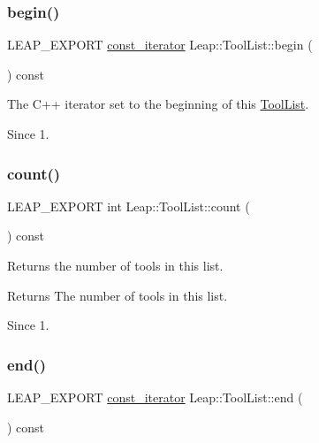 \subsubsection{\texorpdfstring{begin()}{begin()}}
{\footnotesize\ttfamily L\+E\+A\+P\+\_\+\+E\+X\+P\+O\+RT \hyperlink{class_leap_1_1_tool_list_a7f52ee5561016e8d42512e2adbc820de}{const\+\_\+iterator} Leap\+::\+Tool\+List\+::begin (\begin{DoxyParamCaption}{ }\end{DoxyParamCaption}) const}

The C++ iterator set to the beginning of this \hyperlink{class_leap_1_1_tool_list}{Tool\+List}.


\begin{DoxyCodeInclude}
\end{DoxyCodeInclude}
 \begin{DoxySince}{Since}
1. 
\end{DoxySince}
\mbox{\label{class_leap_1_1_tool_list_a3c00cbcc8e1eab50c0767923a85590b7}} 
\subsubsection{\texorpdfstring{count()}{count()}}
{\footnotesize\ttfamily L\+E\+A\+P\+\_\+\+E\+X\+P\+O\+RT int Leap\+::\+Tool\+List\+::count (\begin{DoxyParamCaption}{ }\end{DoxyParamCaption}) const}

Returns the number of tools in this list.


\begin{DoxyCodeInclude}
\end{DoxyCodeInclude}


\begin{DoxyReturn}{Returns}
The number of tools in this list. 
\end{DoxyReturn}
\begin{DoxySince}{Since}
1. 
\end{DoxySince}
\mbox{\label{class_leap_1_1_tool_list_a9fa89f22ffa05f98216f3f0d8c95cbc7}} 
\subsubsection{\texorpdfstring{end()}{end()}}
{\footnotesize\ttfamily L\+E\+A\+P\+\_\+\+E\+X\+P\+O\+RT \hyperlink{class_leap_1_1_tool_list_a7f52ee5561016e8d42512e2adbc820de}{const\+\_\+iterator} Leap\+::\+Tool\+List\+::end (\begin{DoxyParamCaption}{ }\end{DoxyParamCaption}) const}

